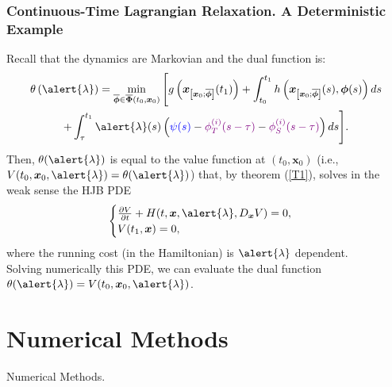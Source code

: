 \begin{frame}
\frametitle{Continuous-Time Lagrangian Relaxation. A Deterministic Example}

Recall that the dynamics are Markovian and the dual function is:
\begin{multline*}
\theta\left(\alert{\lambda}\right)=\min_{\overline{\bm{\phi}}\in\overline{\bm{\Phi}}(t_0,\bm{x}_0)}\Bigg[g\left(\bm{x}_{\left[\bm{x}_0;\overline{\bm{\phi}}\right]}(t_1)\right)+\int_{t_0}^{t_1}h\left(\bm{x}_{\left[\bm{x}_0;\overline{\bm{\phi}}\right]}(s),\bm{\phi}(s)\right)ds\\
+\int_{\tau}^{t_1}\alert{\lambda}(s)\left({\color{blue}\psi(s)}-{\color{violet}\phi_T^{(i)}(s-\tau)}-{\color{violet}\phi_S^{(i)}(s-\tau)}\right)ds\Bigg].
\end{multline*}
Then, $\theta(\alert{\lambda})$ is equal to the value function at $(t_0,\bm{x}_0)$ (i.e., $V(t_0,\bm{x}_0,\alert{\lambda})=\theta(\alert{\lambda})$) that, by theorem (\ref{T1}), solves in the weak sense the HJB PDE
\begin{equation*}
\begin{cases}
\frac{\partial V}{\partial t}+H(t,\bm{x},\alert{\lambda},D_{\bm{x}}V)=0,\\
V(t_1,\bm{x})=0,
\end{cases}
\end{equation*}
where the running cost (in the Hamiltonian) is $\alert{\lambda}$ dependent.\\
Solving numerically this PDE, we can evaluate the dual function $\theta(\alert{\lambda})=V(t_0,\bm{x}_0,\alert{\lambda})$.

\end{frame}


\section{Numerical Methods}
{ 
\begin{frame}[noframenumbering]
\centering
{\Huge Numerical Methods.}
\end{frame}}


